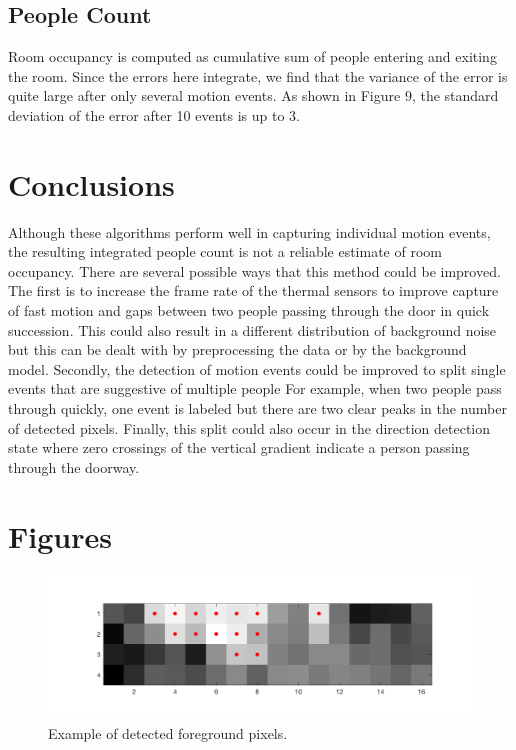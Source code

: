 \documentclass[12pt,oneside]{article} %
\begin{document}
\subsection{People Count}
Room occupancy is computed as cumulative sum of people entering and exiting the room. Since the errors here
integrate, we find that the variance of the error is quite large after only several motion events. As shown in Figure 9,
the standard deviation of the error after 10 events is up to 3.

\section{Conclusions} %
Although these algorithms perform well in capturing individual motion events, the resulting integrated people count is 
not a reliable estimate of room occupancy. There are several possible ways that this method could be improved. The
first is to increase the frame rate of the thermal sensors to improve capture of fast motion and gaps between 
two people passing through the door in quick succession. This could also result in a different distribution of 
background noise but this can be dealt with by preprocessing the data or by the background model. Secondly,
the detection of motion events could be improved to split single events that are suggestive of multiple people
For example, when two people pass through quickly, one event is labeled but there are two clear peaks in the
number of detected pixels. Finally, this split could also occur in the direction detection state where zero crossings
of the vertical gradient indicate a person passing through the doorway.

\newpage
\section{Figures} %
\begin{figure}[htb] 
\centering
\includegraphics[scale=0.45]{images/foreground_example.png}
\caption{Example of detected foreground pixels.}
\label{bgd}
\end{figure}
\end{document}
